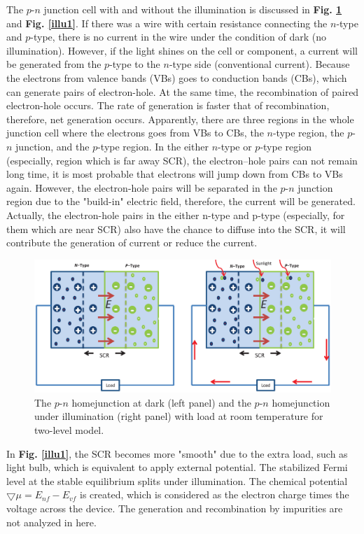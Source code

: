 \documentclass[a4paper, 12pt, titlepage,oneside,drop]{kthesis}
\begin{document}
The $p$-$n$ junction cell with and without the illumination is discussed in \textbf{Fig. \ref{illu}} and \textbf{Fig. \ref{illu1}}. If there was a wire with certain resistance connecting 
the $n$-type and $p$-type, there is no current in the wire under the condition of dark (no illumination). However, if the light shines on the cell or component, a current will be generated from the $p$-type
to the $n$-type side (conventional current). Because the electrons from valence bands (VBs) goes to conduction bands (CBs), which can generate pairs of electron-hole. At the same time, the recombination of paired electron-hole occurs. The rate of generation 
is faster that of recombination, therefore, net generation occurs. Apparently, there are three regions in the whole junction cell where the electrons goes from VBs to CBs, the $n$-type region, the $p$-$n$
junction, and the $p$-type region. In the either $n$-type or $p$-type region (especially, region which is far away SCR), the electron–hole pairs can not remain long time,  it is most probable that electrons
will jump down from CBs to VBs again. However, the electron-hole pairs will be separated in the $p$-$n$ junction region due to the "build-in" electric field, therefore, the current will be generated. Actually, the electron-hole pairs in the either n-type and p-type 
(especially, for them which are near SCR) also have the chance to diffuse into the SCR, it will contribute the generation of current or reduce the current.

\begin{figure}[H]
\centering
\includegraphics[scale=0.5]{illumination.eps}
\caption{The $p$-$n$ homejunction at dark (left panel) and the $p$-$n$ homejunction under illumination (right panel) with load at room temperature for two-level model.}
\label{illu}
\end{figure}

In \textbf{Fig. \ref{illu1}}, the SCR becomes more "smooth" due to the extra load, such as light bulb, which is equivalent to apply external potential. The stabilized Fermi level at the stable equilibrium splits under illumination.
The chemical potential $\bigtriangledown \mu = E_{nf} - E_{vf}$ is created, which is considered as the electron charge times the voltage across the device. The generation and recombination by impurities are not analyzed in here.
\end{document}
